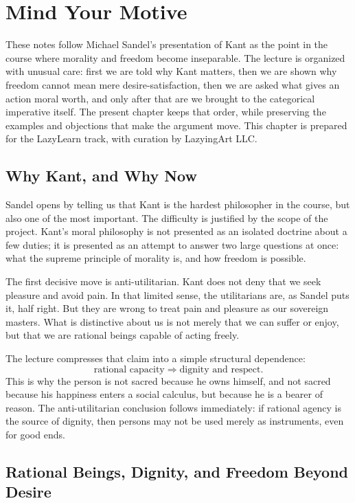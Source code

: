 \chapter{Mind Your Motive}

These notes follow Michael Sandel's presentation of Kant as the point in the course where morality and freedom become inseparable. The lecture is organized with unusual care: first we are told why Kant matters, then we are shown why freedom cannot mean mere desire-satisfaction, then we are asked what gives an action moral worth, and only after that are we brought to the categorical imperative itself. The present chapter keeps that order, while preserving the examples and objections that make the argument move. This chapter is prepared for the LazyLearn track, with curation by LazyingArt LLC.

\section{Why Kant, and Why Now}

Sandel opens by telling us that Kant is the hardest philosopher in the course, but also one of the most important. The difficulty is justified by the scope of the project. Kant's moral philosophy is not presented as an isolated doctrine about a few duties; it is presented as an attempt to answer two large questions at once: what the supreme principle of morality is, and how freedom is possible.

The first decisive move is anti-utilitarian. Kant does not deny that we seek pleasure and avoid pain. In that limited sense, the utilitarians are, as Sandel puts it, half right. But they are wrong to treat pain and pleasure as our sovereign masters. What is distinctive about us is not merely that we can suffer or enjoy, but that we are rational beings capable of acting freely.

The lecture compresses that claim into a simple structural dependence:
\begin{equation}
\text{rational capacity} \Longrightarrow \text{dignity and respect}.
\end{equation}
This is why the person is not sacred because he owns himself, and not sacred because his happiness enters a social calculus, but because he is a bearer of reason. The anti-utilitarian conclusion follows immediately: if rational agency is the source of dignity, then persons may not be used merely as instruments, even for good ends.

\section{Rational Beings, Dignity, and Freedom Beyond Desire}

